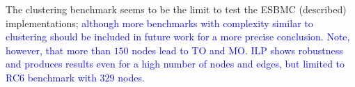 \documentclass{doublecol-new}
\theoremstyle{TH}{
\newtheorem{lemma}{Lemma}
\newtheorem{theorem}[lemma]{Theorem}
\newtheorem{corrolary}[lemma]{Corrolary}
\newtheorem{conjecture}[lemma]{Conjecture}
\newtheorem{proposition}[lemma]{Proposition}
\newtheorem{claim}[lemma]{Claim}
\newtheorem{stheorem}[lemma]{Wrong Theorem}
\newtheorem{algorithm}{Algorithm}
}
\theoremstyle{THrm}{
\newtheorem{definition}{Definition}[section]
\newtheorem{question}{Question}[section]
\newtheorem{remark}{Remark}
\newtheorem{scheme}{Scheme}
}
\theoremstyle{THhit}{
\newtheorem{case}{Case}[section]
}
\begin{document}
The clustering benchmark seems to be the limit to test the ESBMC (described) implementations; 
\textcolor{blue}{although more benchmarks with complexity similar to clustering should be included in future work for a more precise conclusion. Note, however, that more than $150$ nodes lead to TO and MO. ILP shows robustness and produces results even for a high number of nodes and edges, but limited to RC$6$ benchmark with $329$ nodes.}




\end{document}
